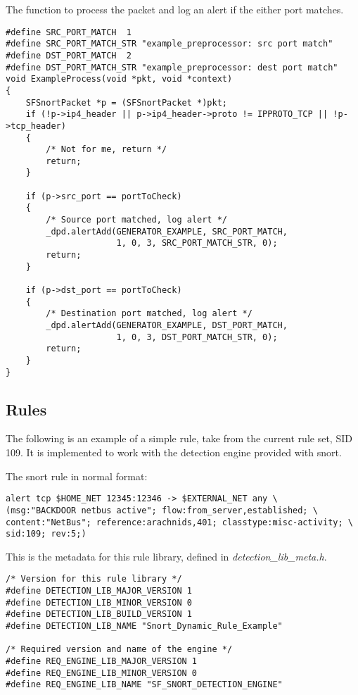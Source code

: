 \documentclass[english]{report}
\begin{document}
The function to process the packet and log an alert if the either port matches.

\begin{verbatim}
#define SRC_PORT_MATCH  1
#define SRC_PORT_MATCH_STR "example_preprocessor: src port match"
#define DST_PORT_MATCH  2
#define DST_PORT_MATCH_STR "example_preprocessor: dest port match"
void ExampleProcess(void *pkt, void *context)
{
    SFSnortPacket *p = (SFSnortPacket *)pkt;
    if (!p->ip4_header || p->ip4_header->proto != IPPROTO_TCP || !p->tcp_header)
    {
        /* Not for me, return */
        return;
    }

    if (p->src_port == portToCheck)
    {
        /* Source port matched, log alert */
        _dpd.alertAdd(GENERATOR_EXAMPLE, SRC_PORT_MATCH,
                      1, 0, 3, SRC_PORT_MATCH_STR, 0);
        return;
    }

    if (p->dst_port == portToCheck)
    {
        /* Destination port matched, log alert */
        _dpd.alertAdd(GENERATOR_EXAMPLE, DST_PORT_MATCH,
                      1, 0, 3, DST_PORT_MATCH_STR, 0);
        return;
    }
}
\end{verbatim}

\subsection{Rules}

The following is an example of a simple rule, take from the current rule set,
SID 109.  It is implemented to work with the detection engine provided with
snort.

The snort rule in normal format:

\begin{verbatim}
alert tcp $HOME_NET 12345:12346 -> $EXTERNAL_NET any \
(msg:"BACKDOOR netbus active"; flow:from_server,established; \
content:"NetBus"; reference:arachnids,401; classtype:misc-activity; \
sid:109; rev:5;)
\end{verbatim}

This is the metadata for this rule library, defined in {\em
detection\_lib\_meta.h}.

\begin{verbatim}
/* Version for this rule library */
#define DETECTION_LIB_MAJOR_VERSION 1
#define DETECTION_LIB_MINOR_VERSION 0
#define DETECTION_LIB_BUILD_VERSION 1
#define DETECTION_LIB_NAME "Snort_Dynamic_Rule_Example"

/* Required version and name of the engine */
#define REQ_ENGINE_LIB_MAJOR_VERSION 1
#define REQ_ENGINE_LIB_MINOR_VERSION 0
#define REQ_ENGINE_LIB_NAME "SF_SNORT_DETECTION_ENGINE"

\end{verbatim}
\end{document}
